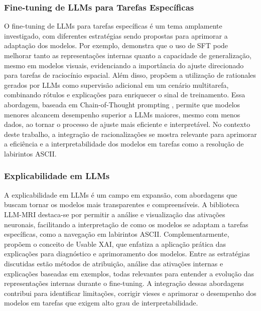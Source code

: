 \subsubsection{Fine-tuning de LLMs para Tarefas Específicas}

O fine-tuning de LLMs para tarefas específicas é um tema amplamente investigado, com diferentes estratégias sendo propostas para aprimorar a adaptação dos modelos. Por exemplo, \cite{wang2024picture} demonstra que o uso de SFT pode melhorar tanto as representações internas quanto a capacidade de generalização, mesmo em modelos visuais, evidenciando a importância do ajuste direcionado para tarefas de raciocínio espacial. Além disso, \cite{hsieh2023distillingstepbystep} propõem a utilização de rationales gerados por LLMs como supervisão adicional em um cenário multitarefa, combinando rótulos e explicações para enriquecer o sinal de treinamento. Essa abordagem, baseada em Chain-of-Thought prompting \cite{wei2023chainofthought}, permite que modelos menores alcancem desempenho superior a LLMs maiores, mesmo com menos dados, ao tornar o processo de ajuste mais eficiente e interpretável. No contexto deste trabalho, a integração de racionalizações se mostra relevante para aprimorar a eficiência e a interpretabilidade dos modelos em tarefas como a resolução de labirintos ASCII.

\subsubsection{Explicabilidade em LLMs}

A explicabilidade em LLMs é um campo em expansão, com abordagens que buscam tornar os modelos mais transparentes e compreensíveis. A biblioteca LLM-MRI \cite{costa2024llmmri} destaca-se por permitir a análise e visualização das ativações neuronais, facilitando a interpretação de como os modelos se adaptam a tarefas específicas, como a navegação em labirintos ASCII. Complementarmente, \cite{wu2025usablexai10strategies} propõem o conceito de Usable XAI, que enfatiza a aplicação prática das explicações para diagnóstico e aprimoramento dos modelos. Entre as estratégias discutidas estão métodos de atribuição, análise das ativações internas e explicações baseadas em exemplos, todas relevantes para entender a evolução das representações internas durante o fine-tuning. A integração dessas abordagens contribui para identificar limitações, corrigir vieses e aprimorar o desempenho dos modelos em tarefas que exigem alto grau de interpretabilidade.